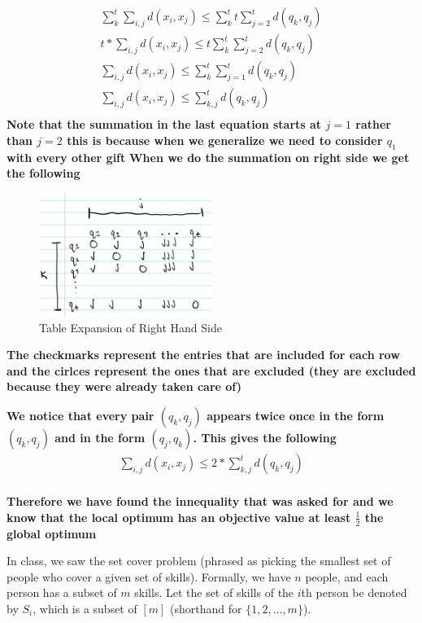\documentclass[addpoints]{exam}
\def\mysolution#1{}    %
\begin{document}
\begin{questions}
\begin{parts}
\begin{align*}
    \sum_k^t \sum_{i,j}d(x_i, x_j) \le \sum_k^t t \sum_{j=2}^{t} d(q_k,q_j) \\
    t * \sum_{i,j} d(x_i, x_j) \le t \sum_k^t \sum_{j=2}^{t} d(q_k,q_j) \\
    \sum_{i,j} d(x_i, x_j) \le \sum_k^t \sum_{j=1}^{t} d(q_k,q_j) \\
    \sum_{i,j} d(x_i, x_j) \le \sum_{k,j}^{t} d(q_k,q_j) \\
\end{align*}
\textbf{Note that the summation in the last equation starts at $j=1$ rather than $j=2$ this is because when we generalize we need to consider $q_1$ with every other gift}
\textbf{When we do the summation on right side we get the following}
 \begin{figure}[H]
 \centering
  \includegraphics[width=0.5\textwidth]{RHS expansion.png}
 \caption{Table Expansion of Right Hand Side}
 \end{figure}

\textbf{The checkmarks represent the entries that are included for each row and the cirlces represent the ones that are excluded (they are excluded because they were already taken care of)}

\textbf{We notice that every pair $(q_k,q_j)$ appears twice once in the form $(q_k,q_j)$ and in the form $(q_j, q_k)$. This gives the following}
\begin{align*}
\sum_{i,j} d(x_i, x_j) \le 2 * \sum_{k,j}^{t} d(q_k,q_j) \\
\end{align*}

\textbf{Therefore we have found the innequality that was asked for and we know that the local optimum has an objective value at least $\frac{1}{2}$ the global optimum}
\mysolution{

}
\end{parts}
\newpage
{}
In class, we saw the set cover problem (phrased as picking the smallest set of people who cover a given set of skills). Formally, we have $n$ people, and each person has a subset of $m$ skills. Let the set of skills of the $i$th person be denoted by $S_i$, which is a subset of $[m]$ (shorthand for $\{1, 2, \dots, m\}$). 
\begin{parts}

\end{parts}
\end{questions}
\end{document}
